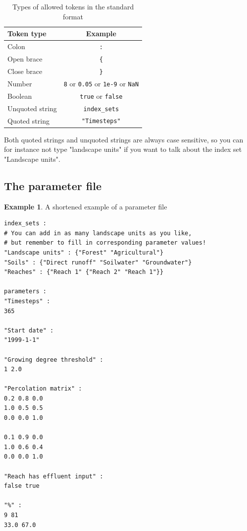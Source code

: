 \documentclass[11pt]{article}
\theoremstyle{definition}
\newtheorem{myexample}{Example}
\newenvironment{example}%
  {\begin{lrbox}{\examplebox}%
   \begin{minipage}{\dimexpr\linewidth-2\fboxsep}
   \begin{myexample}}%
  {\end{myexample}%
   \end{minipage}%
   \end{lrbox}%
   \begin{trivlist}
     \item[]\colorbox{silver}{\usebox\examplebox}
   \end{trivlist}}
\begin{document}
\begin{table}[H]
\centering
\label{tab:tokens}
\begin{tabular}{|l|c|}
\hline
{\bf Token type} & {\bf Example} \\
\hline
Colon & {\tt :}  \\
\hline
Open brace & {\tt \{} \\
\hline
Close brace & {\tt \}} \\
\hline
Number & {\tt 8} or {\tt 0.05} or {\tt 1e-9} or {\tt NaN} \\
\hline
Boolean &{\tt  true} or {\tt false} \\
\hline
Unquoted string & {\tt index\_sets} \\
\hline
Quoted string & {\tt "Timesteps"} \\
\hline
\end{tabular}
\caption{Types of allowed tokens in the standard format}
\end{table}

Both quoted strings and unquoted strings are always case sensitive, so you can for instance not type "landscape units" if you want to talk about the index set "Landscape units".

\subsection{The parameter file}

\begin{example}\label{ex:parameterfile}
A shortened example of a parameter file
\begin{lstlisting}
index_sets :
# You can add in as many landscape units as you like,
# but remember to fill in corresponding parameter values!
"Landscape units" : {"Forest" "Agricultural"}
"Soils" : {"Direct runoff" "Soilwater" "Groundwater"}
"Reaches" : {"Reach 1" {"Reach 2" "Reach 1"}}

parameters :
"Timesteps" :
365

"Start date" :
"1999-1-1"

"Growing degree threshold" :
1 2.0

"Percolation matrix" :
0.2 0.8 0.0
1.0 0.5 0.5
0.0 0.0 1.0

0.1 0.9 0.0
1.0 0.6 0.4
0.0 0.0 1.0

"Reach has effluent input" :
false true

"%" :
9 81
33.0 67.0
\end{lstlisting}
\end{example}
\end{document}
